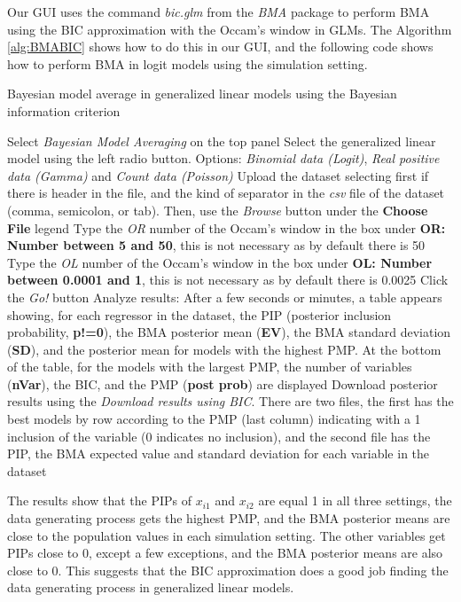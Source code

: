 Our GUI uses the command \textit{bic.glm} from the \textit{BMA} package to perform BMA using the BIC approximation with the Occam's window in GLMs. The Algorithm \ref{alg:BMABIC} shows how to do this in our GUI, and the following code shows how to perform BMA in logit models using the simulation setting.

\begin{algorithm}[h!]
	\caption{Bayesian model average in generalized linear models using the Bayesian information criterion}\label{alg:BMABIC}
	\begin{algorithmic}[1]  		 			
		\State Select \textit{Bayesian Model Averaging} on the top panel
		\State Select the generalized linear model using the left radio button. Options: \textit{Binomial data (Logit)}, \textit{Real positive data (Gamma)} and \textit{Count data (Poisson)}
		\State Upload the dataset selecting first if there is header in the file, and the kind of separator in the \textit{csv} file of the dataset (comma, semicolon, or tab). Then, use the \textit{Browse} button under the \textbf{Choose File} legend
		\State Type the \textit{OR} number of the Occam's window in the box under \textbf{OR: Number between 5 and 50}, this is not necessary as by default there is 50
		\State Type the \textit{OL} number of the Occam's window in the box under \textbf{OL: Number between 0.0001 and 1}, this is not necessary as by default there is 0.0025
		\State Click the \textit{Go!} button
		\State Analyze results: After a few seconds or minutes, a table appears showing, for each regressor in the dataset, the PIP (posterior inclusion probability, \textbf{p!=0}), the BMA posterior mean (\textbf{EV}), the BMA standard deviation (\textbf{SD}), and the posterior mean for models with the highest PMP. At the bottom of the table, for the models with the largest PMP, the number of variables (\textbf{nVar}), the BIC, and the PMP (\textbf{post prob}) are displayed
		\State Download posterior results using the \textit{Download results using BIC}. There are two files, the first has the best models by row according to the PMP (last column) indicating with a 1 inclusion of the variable (0 indicates no inclusion), and the second file has the PIP, the BMA expected value and standard deviation for each variable in the dataset
	\end{algorithmic} 
\end{algorithm}

The results show that the PIPs of $x_{i1}$ and $x_{i2}$ are equal 1 in all three settings, the data generating process gets the highest PMP, and the BMA posterior means are close to the population values in each simulation setting. The other variables get PIPs close to 0, except a few exceptions, and the BMA posterior means are also close to 0. This suggests that the BIC approximation does a good job finding the data generating process in generalized linear models.
 
